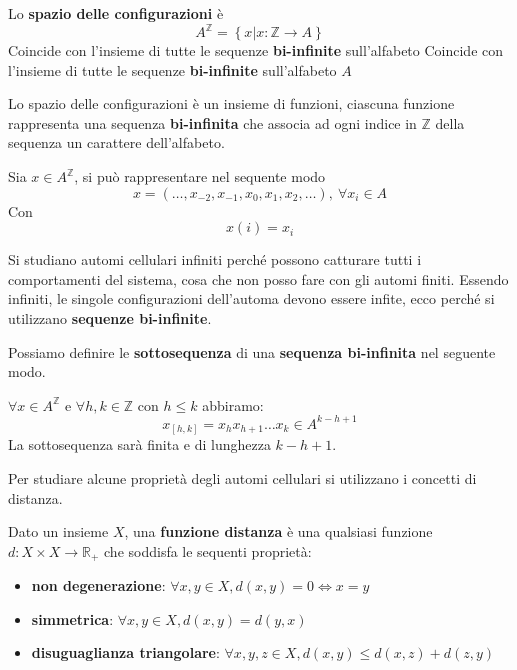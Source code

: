 \begin{definizione}
    Lo \textbf{spazio delle configurazioni} è
    $$A^\mathbb{Z}= \left\{x|x:\mathbb{Z}\rightarrow A\right\}$$
    Coincide con l'insieme di tutte le sequenze \textbf{bi-infinite} sull'alfabeto
    Coincide con l'insieme di tutte le sequenze \textbf{bi-infinite} sull'alfabeto
    $A$
\end{definizione}
Lo spazio delle configurazioni è un insieme di funzioni, ciascuna funzione rappresenta
una sequenza \textbf{bi-infinita} che associa ad ogni indice in $\mathbb{Z}$ della
sequenza un carattere dell'alfabeto.
\begin{esempio}
    Sia $x\in A^\mathbb{Z}$, si può rappresentare nel sequente modo
    $$x = \left(\dots, x_{-2}, x_{-1},x_{0},x_{1},x_{2},\dots\right), \ \forall x_i\in A$$
    Con
    $$x(i) = x_i$$
\end{esempio}

Si studiano automi cellulari infiniti perché possono catturare tutti i comportamenti
del sistema, cosa che non posso fare con gli automi finiti. Essendo infiniti,
le singole configurazioni dell'automa devono essere infite, ecco perché si utilizzano
\textbf{sequenze bi-infinite}.

\begin{definizione} 
    Possiamo definire le \textbf{sottosequenza} di una \textbf{sequenza bi-infinita}
    nel seguente modo.

    $\forall x \in A^{\mathbb{Z}}$ e $\forall h,k\in \mathbb{Z}$ con $h\le k$
    abbiramo:
    $$x_{[h,k]}= x_hx_{h+1}\dots x_k\in A^{k-h+1}$$
    La sottosequenza sarà finita e di lunghezza $k-h+1$.
\end{definizione}

Per studiare alcune proprietà degli automi cellulari si utilizzano i concetti di
distanza.
\begin{definizione}
    Dato un insieme $X$, una \textbf{funzione distanza} è una qualsiasi funzione
    $d:X\times X \rightarrow \mathbb{R}_+$ che soddisfa le sequenti proprietà:
    \begin{itemize}
        \item \textbf{non degenerazione}: $\forall x,y\in X, d(x,y) = 0\iff x=y$
        \item \textbf{simmetrica}: $\forall x,y\in X, d(x,y) = d(y,x)$
        \item \textbf{disuguaglianza triangolare}: $\forall x,y,z\in X, d(x,y) \le d(x,z)+d(z,y)$
    \end{itemize}
\end{definizione}

